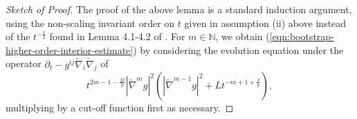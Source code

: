 \documentclass[12pt]{amsart}
\newcommand{\hdel}{\tilde{\nabla}}
\newtheorem{prop}[thm]{Proposition}
\theoremstyle{remark}
\numberwithin{equation}{section}
\def\red{\color{red}}
\begin{document}
\begin{proof}[Sketch of Proof]
    The proof of the above lemma is a standard induction argument, using the non-scaling invariant order on $t$ given in assumption (ii) above instead of the $t^{-\frac{1}{2}}$ found in Lemma 4.1-4.2 of \cite{simon_deformation_2002}. For $m \in \mathbb{N}$, we obtain (\ref{eqn:bootstrap-higher-order-interior-estimate}) by considering the evolution equation under the operator $\partial_t - g^{ij}\hdel_i\hdel_j$ of 
    \begin{equation*}
        t^{2m-1-\frac{2\delta}{p}}|\hdel^m g|^2\left(|\hdel^{m-1}g|^2 + Lt^{-m+1+\frac{\delta}{p}}\right),
    \end{equation*}
    multiplying by a cut-off function first as necessary.
\end{proof}
%
%
%
%
\end{document}
